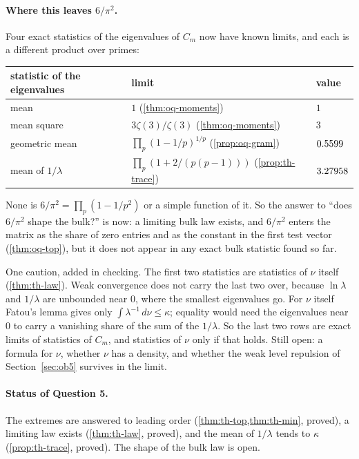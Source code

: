 \paragraph{Where this leaves $6/\pi^2$.} Four exact statistics of the eigenvalues of $C_m$ now have known limits, and each is a different product over primes:
\begin{center}
\begin{tabular}{lll}
\toprule
statistic of the eigenvalues & limit & value \\
\midrule
mean & $1$ (\cref{thm:oq-moments}) & $1$ \\
mean square & $3\zeta(3)/\zeta(3)$ (\cref{thm:oq-moments}) & $3$ \\
geometric mean & $\prod_p(1 - 1/p)^{1/p}$ (\cref{prop:oq-gram}) & $0.5599$ \\
mean of $1/\lambda$ & $\prod_p(1 + 2/(p(p-1)))$ (\cref{prop:th-trace}) & $3.27958$ \\
\bottomrule
\end{tabular}
\end{center}
None is $6/\pi^2 = \prod_p(1 - 1/p^2)$ or a simple function of it. So the answer to ``does $6/\pi^2$ shape the bulk?'' is now: a limiting bulk law exists, and $6/\pi^2$ enters the matrix as the share of zero entries and as the constant in the first test vector (\cref{thm:oq-top}), but it does not appear in any exact bulk statistic found so far.

One caution, added in checking. The first two statistics are statistics of $\nu$ itself (\cref{thm:th-law}). Weak convergence does not carry the last two over, because $\ln\lambda$ and $1/\lambda$ are unbounded near 0, where the smallest eigenvalues go. For $\nu$ itself Fatou's lemma gives only $\int\lambda^{-1}\,d\nu \le \kappa$; equality would need the eigenvalues near 0 to carry a vanishing share of the sum of the $1/\lambda$. So the last two rows are exact limits of statistics of $C_m$, and statistics of $\nu$ only if that holds. Still open: a formula for $\nu$, whether $\nu$ has a density, and whether the weak level repulsion of Section~\ref{sec:ob5} survives in the limit.

\paragraph{Status of Question 5.} The extremes are answered to leading order (\cref{thm:th-top,thm:th-min}, proved), a limiting law exists (\cref{thm:th-law}, proved), and the mean of $1/\lambda$ tends to $\kappa$ (\cref{prop:th-trace}, proved). The shape of the bulk law is open.

